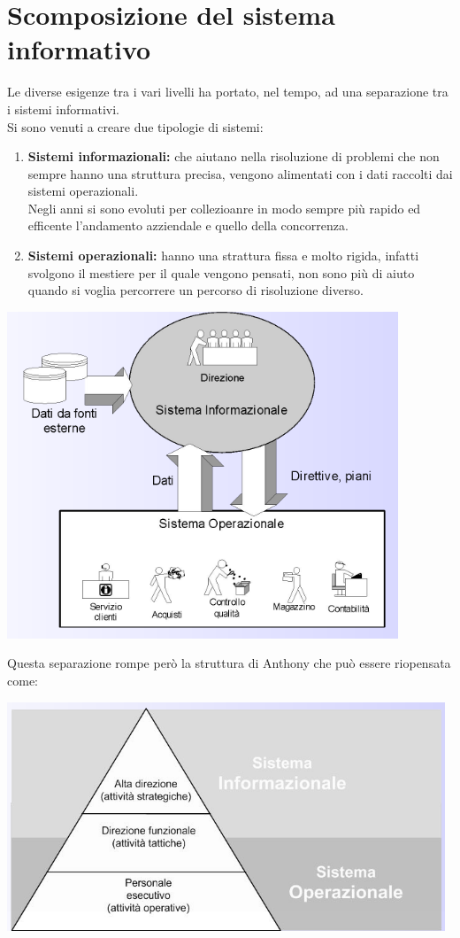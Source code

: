 \documentclass{book}
\begin{document}
    \section{Scomposizione del sistema informativo}
    Le diverse esigenze tra i  vari livelli ha portato, nel tempo, ad una separazione tra i sistemi informativi.\\
    Si sono venuti a creare due tipologie di sistemi:
    \begin{enumerate}
        \item \textbf{Sistemi informazionali:} che aiutano nella risoluzione di problemi che non sempre hanno una struttura precisa, vengono alimentati con i dati raccolti dai sistemi operazionali.\\
            Negli anni si sono evoluti per collezioanre in modo sempre più rapido ed efficente l'andamento azziendale e quello della concorrenza.
        \item \textbf{Sistemi operazionali:} hanno una strattura fissa e molto rigida, infatti svolgono il mestiere per il quale vengono pensati, non sono più di aiuto quando si voglia percorrere un percorso di risoluzione diverso.
    \end{enumerate}
    \begin{center}
        \includegraphics[scale=0.6]{relazione_sistemi_operazionale_informazionale.png}
    \end{center}
    Questa separazione rompe però la struttura di Anthony che può essere riopensata come:
    \begin{center}
        \includegraphics[scale=0.5]{anthony_mark_02.png}
    \end{center}
\end{document}
